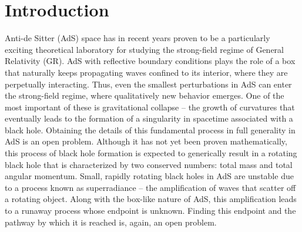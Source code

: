 \documentclass[a4paper,11pt]{article}
\begin{document}
\tableofcontents

%
% 

\hrulefill
\vspace{10pt}

\section{Introduction}

Anti-de Sitter (AdS) space has in recent years proven to be a particularly exciting theoretical laboratory for studying the strong-field regime of General Relativity (GR).
AdS with reflective boundary conditions plays the role of a box that naturally keeps propagating waves confined to its interior, where they are perpetually interacting.
Thus, even the smallest perturbations in AdS can enter the strong-field regime, where qualitatively new behavior emerges.
One of the most important of these is gravitational collapse -- the growth of curvatures that eventually leads to the formation of a singularity in spacetime associated with a black hole.
Obtaining the details of this fundamental process in full generality in AdS is an open problem. 
Although it has not yet been proven mathematically, this process of black hole formation is expected to generically result in a rotating black hole that is characterized by two conserved numbers: total mass and total angular momentum.
Small, rapidly rotating black holes in AdS are unstable due to a process known as superradiance -- the amplification of waves that scatter off a rotating object.
Along with the box-like nature of AdS, this amplification leads to a runaway process whose endpoint is unknown.
Finding this endpoint and the pathway by which it is reached is, again, an open problem.
\end{document}
